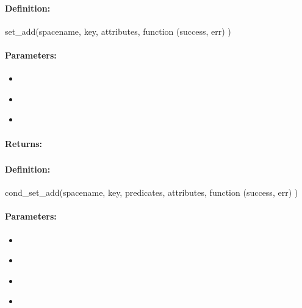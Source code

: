 \paragraph{Definition:}
\begin{javascriptcode}
set_add(spacename, key, attributes, function (success, err) {})
\end{javascriptcode}
\paragraph{Parameters:}
\begin{itemize}[noitemsep]
\item {}\\

\item {}\\

\item {}\\

\end{itemize}

\paragraph{Returns:}


\pagebreak
\subsubsection{}
\label{api:nodejs:cond_set_add}


\paragraph{Definition:}
\begin{javascriptcode}
cond_set_add(spacename, key, predicates, attributes, function (success, err) {})
\end{javascriptcode}
\paragraph{Parameters:}
\begin{itemize}[noitemsep]
\item {}\\

\item {}\\

\item {}\\

\item {}\\

\end{itemize}

